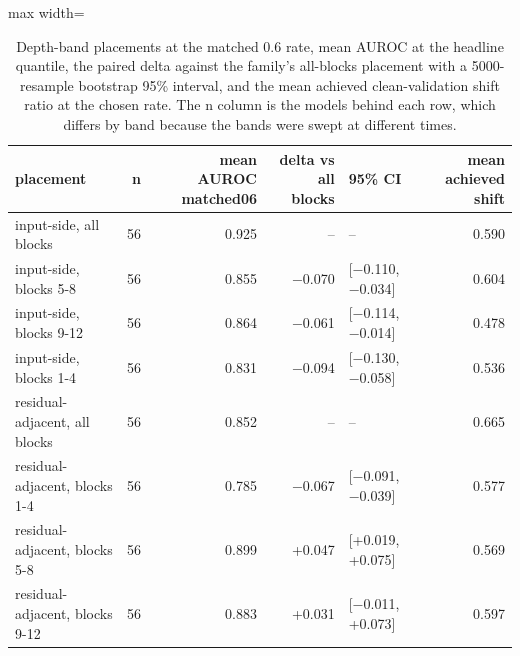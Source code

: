\begin{table}[htbp]
\centering
\small
\caption{Depth-band placements at the matched 0.6 rate, mean AUROC at the headline quantile, the paired delta against the family's all-blocks placement with a 5000-resample bootstrap 95\% interval, and the mean achieved clean-validation shift ratio at the chosen rate. The n column is the models behind each row, which differs by band because the bands were swept at different times.}
\label{tab:depth-bands}
\begin{adjustbox}{max width=\linewidth}
\begin{tabular}{lrrrlr}
\toprule
placement & n & mean AUROC matched06 & delta vs all blocks & 95\% CI & mean achieved shift \\
\midrule
input-side, all blocks & 56 & 0.925 & -- & -- & 0.590 \\
input-side, blocks 5-8 & 56 & 0.855 & $-$0.070 & [$-$0.110, $-$0.034] & 0.604 \\
input-side, blocks 9-12 & 56 & 0.864 & $-$0.061 & [$-$0.114, $-$0.014] & 0.478 \\
input-side, blocks 1-4 & 56 & 0.831 & $-$0.094 & [$-$0.130, $-$0.058] & 0.536 \\
residual-adjacent, all blocks & 56 & 0.852 & -- & -- & 0.665 \\
residual-adjacent, blocks 1-4 & 56 & 0.785 & $-$0.067 & [$-$0.091, $-$0.039] & 0.577 \\
residual-adjacent, blocks 5-8 & 56 & 0.899 & +0.047 & [+0.019, +0.075] & 0.569 \\
residual-adjacent, blocks 9-12 & 56 & 0.883 & +0.031 & [$-$0.011, +0.073] & 0.597 \\
\bottomrule
\end{tabular}
\end{adjustbox}
\end{table}
